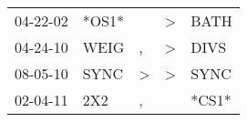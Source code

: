 \begin{supertabular}{lllll}
 04-22-02 &  *OS1* &               &  \textgreater &   BATH \\
 04-24-10 &   WEIG &             , &  \textgreater &   DIVS \\
 08-05-10 &   SYNC &  \textgreater &  \textgreater &   SYNC \\
 02-04-11 &    2X2 &             , &               &  *CS1* \\
\end{supertabular}

